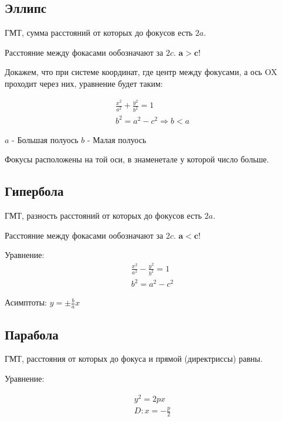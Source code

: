 \documentclass[12pt, a4paper]{article}
\begin{document}
    \subsection{Эллипс}
    
    \begin{definition}
        [Эллипс]
        ГМТ, сумма расстояний от которых до фокусов есть $2a$.
    \end{definition}

    Расстояние между фокасами ообозначают за $2c$.
    $\symbf{a > c}$!

    Докажем, что при системе координат, где центр между фокусами, а ось OX проходит через них, уравнение будет таким:

    \begin{gather}
        \frac{x^2}{a^2} + \frac{y^2}{b^2} = 1 \\
        b^2 = a^2 - c^2 \Rightarrow b < a
    \end{gather}

    $a$ - Большая полуось
    $b$ - Малая полуось

    \begin{note}
        Фокусы расположены на той оси, в знаменетале у которой число больше.
    \end{note}

    \subsection{Гипербола}
    
    \begin{definition}
        [Гипербола]
        ГМТ, разность расстояний от которых до фокусов есть $2a$.
    \end{definition}

    Расстояние между фокасами ообозначают за $2c$.
    $\symbf{a < c}$!

    Уравнение:
    \begin{gather}
        \frac{x^2}{a^2} - \frac{y^2}{b^2} = 1 \\
        b^2 = a^2 - c^2
    \end{gather}

    Асимптоты: $y = \pm \frac{b}{a} x$
    
    \subsection{Парабола}
    
    \begin{definition}
        [Парабола]
        ГМТ, расстояния от которых до фокуса и прямой (директриссы) равны.
    \end{definition}
    
    Уравнение:

    \begin{gather}
        y^2 = 2px \\
        D: x = -\frac{p}{2}
    \end{gather}
    
\end{document}
